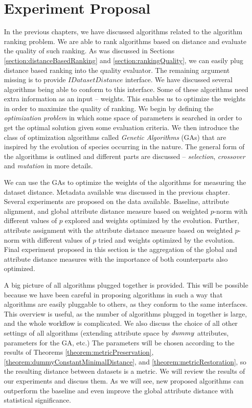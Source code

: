 \chapter{Experiment Proposal}
\label{chapter:metricExperiments}
In the previous chapters, we have discussed algorithms related to the algorithm ranking problem. We are able to rank algorithms based on distance and evaluate the quality of such ranking. As was discussed in Sections \ref{section:distanceBasedRanking} and \ref{section:rankingQuality}, we can easily plug distance based ranking into the quality evaluator. The remaining argument missing is to provide $IDatasetDistance$ interface. We have discussed several algorithms being able to conform to this interface. Some of these algorithms need extra information as an input -- weights. This enables us to optimize the weights in order to maximize the quality of ranking.
We begin by defining the \emph{optimization problem} in which some space of parameters is searched in order to get the optimal solution given some evaluation criteria. We then introduce the class of optimization algorithms called \emph{Genetic Algorithms} (GAs) that are inspired by the evolution of species occurring in the nature. The general form of the algorithms is outlined and different parts are discussed -- \emph{selection}, \emph{crossover} and \emph{mutation} in more details.

We can use the GAs to optimize the weights of the algorithms for measuring the dataset distance. Metadata available was discussed in the previous chapter. 
Several experiments are proposed on the data available. Baseline, attribute alignment, and global attribute distance measure based on weighted $p$-norm with different values of $p$ explored and weights optimized by the evolution. Further, attribute assignment with the attribute distance measure  based on weighted $p$-norm with different values of $p$ tried and weights optimized by the evolution. Final experiment proposed in this section is the aggregation of the global and attribute distance measures with the importance of both counterparts also optimized. 

A big picture of all algorithms plugged together is provided. This will be possible because we have been careful in proposing algorithms in such a way that algorithms are easily pluggable to others, as they conform to the same interfaces. This overview is useful, as the number of algorithms plugged in together is large, and the whole workflow is complicated.
We also discuss the choice of all other settings of all algorithms (extending attribute space by $dummy$ attributes, parameters for the GA, etc.)
The parameters will be chosen according to the results of Theorems \ref{theorem:metricPreservation}, \ref{theorem:dummyConstantMinimalDistance}, and \ref{theorem:metricRestoration}, so the resulting distance between datasets is a metric.
We will review the results of our experiments and discuss them. As we will see, new proposed algorithms can outperform the baseline and even improve the global attribute distance with statistical significance.

